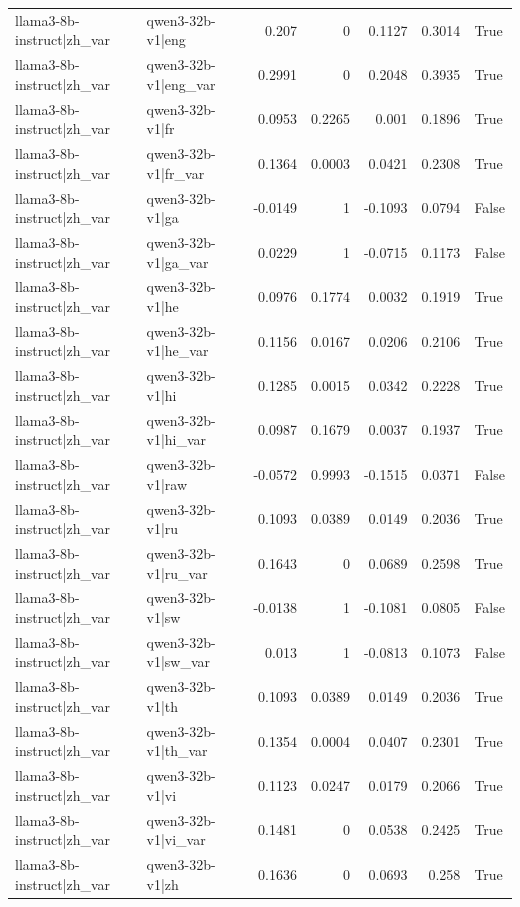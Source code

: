 \begin{table}
\begin{tabular}{l l r r r r l}
llama3-8b-instruct|zh_var & qwen3-32b-v1|eng & 0.207 & 0 & 0.1127 & 0.3014 & True \\
llama3-8b-instruct|zh_var & qwen3-32b-v1|eng_var & 0.2991 & 0 & 0.2048 & 0.3935 & True \\
llama3-8b-instruct|zh_var & qwen3-32b-v1|fr & 0.0953 & 0.2265 & 0.001 & 0.1896 & True \\
llama3-8b-instruct|zh_var & qwen3-32b-v1|fr_var & 0.1364 & 0.0003 & 0.0421 & 0.2308 & True \\
llama3-8b-instruct|zh_var & qwen3-32b-v1|ga & -0.0149 & 1 & -0.1093 & 0.0794 & False \\
llama3-8b-instruct|zh_var & qwen3-32b-v1|ga_var & 0.0229 & 1 & -0.0715 & 0.1173 & False \\
llama3-8b-instruct|zh_var & qwen3-32b-v1|he & 0.0976 & 0.1774 & 0.0032 & 0.1919 & True \\
llama3-8b-instruct|zh_var & qwen3-32b-v1|he_var & 0.1156 & 0.0167 & 0.0206 & 0.2106 & True \\
llama3-8b-instruct|zh_var & qwen3-32b-v1|hi & 0.1285 & 0.0015 & 0.0342 & 0.2228 & True \\
llama3-8b-instruct|zh_var & qwen3-32b-v1|hi_var & 0.0987 & 0.1679 & 0.0037 & 0.1937 & True \\
llama3-8b-instruct|zh_var & qwen3-32b-v1|raw & -0.0572 & 0.9993 & -0.1515 & 0.0371 & False \\
llama3-8b-instruct|zh_var & qwen3-32b-v1|ru & 0.1093 & 0.0389 & 0.0149 & 0.2036 & True \\
llama3-8b-instruct|zh_var & qwen3-32b-v1|ru_var & 0.1643 & 0 & 0.0689 & 0.2598 & True \\
llama3-8b-instruct|zh_var & qwen3-32b-v1|sw & -0.0138 & 1 & -0.1081 & 0.0805 & False \\
llama3-8b-instruct|zh_var & qwen3-32b-v1|sw_var & 0.013 & 1 & -0.0813 & 0.1073 & False \\
llama3-8b-instruct|zh_var & qwen3-32b-v1|th & 0.1093 & 0.0389 & 0.0149 & 0.2036 & True \\
llama3-8b-instruct|zh_var & qwen3-32b-v1|th_var & 0.1354 & 0.0004 & 0.0407 & 0.2301 & True \\
llama3-8b-instruct|zh_var & qwen3-32b-v1|vi & 0.1123 & 0.0247 & 0.0179 & 0.2066 & True \\
llama3-8b-instruct|zh_var & qwen3-32b-v1|vi_var & 0.1481 & 0 & 0.0538 & 0.2425 & True \\
llama3-8b-instruct|zh_var & qwen3-32b-v1|zh & 0.1636 & 0 & 0.0693 & 0.258 & True \\

\end{tabular}
\end{table}
